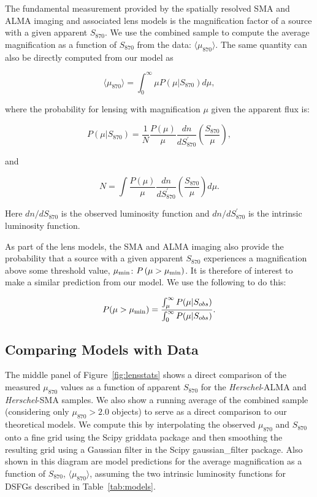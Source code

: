 \documentclass[iop]{emulateapj}
\begin{document}
The fundamental measurement provided by the spatially resolved SMA and ALMA
imaging and associated lens models is the magnification factor of a source with
a given apparent $S_{870}$.  We use the combined sample to compute the average
magnification as a function of $S_{870}$ from the data:
$\langle\mu_{870}\rangle$.  The same quantity can also be directly computed
from our model as 

\begin{equation}
    \langle\mu_{870}\rangle = \int_0^\infty \mu P(\mu|S_{870})  d\mu,
 \end{equation}

\noindent where the probability for lensing with magnification $\mu$ given the
apparent flux is:

\begin{equation}
    P(\mu|S_{870}) = \frac{1}{N} \frac{P(\mu)}{\mu} \frac{dn}{dS_{870}^\prime}
\left(\frac{S_{870}}{\mu}\right),
\end{equation} 

\noindent and 

\begin{equation}
    N = \int \frac{P(\mu)}{\mu} \frac{dn}{dS_{870}^\prime}
    \left(\frac{S_{870}}{\mu}\right)d\mu.
\end{equation}

\noindent Here $ dn/dS_{870}$ is the observed luminosity function and
$dn/dS_{870}^\prime$ is the intrinsic luminosity function.

As part of the lens models, the SMA and ALMA imaging also provide the
probability that a source with a given apparent $S_{870}$ experiences a
magnification above some threshold value, $\mu_{\rm min}$: $P\,(\mu > \mu_{\rm
min})$.  It is therefore of interest to make a similar prediction from our
model.  We use the following to do this:

\begin{equation}
    P(\mu>\mu_{\rm min}) = \frac{\int_\mu^\infty P(\mu|S_{obs})}{\int_0^\infty
    P(\mu|S_{obs})}.
\end{equation}

\subsection{Comparing Models with Data}

The middle panel of Figure~\ref{fig:lensstats} shows a direct comparison of the
measured $\mu_{870}$ values as a function of apparent $S_{870}$ for the {\it
Herschel}-ALMA and {\it Herschel}-SMA samples.  We also show a running average
of the combined sample (considering only $\mu_{870} > 2.0$ objects) to serve as
a direct comparison to our theoretical models.  We compute this by
interpolating the observed $\mu_{870}$ and $S_{870}$ onto a fine grid using the
{\sc Scipy} {\sc griddata} package and then smoothing the resulting grid using
a Gaussian filter in the Scipy {\sc gaussian\_filter} package.
Also shown in this diagram are model predictions for the average magnification
as a function of $S_{870}$, $\langle\mu_{870}\rangle$, assuming the two
intrinsic luminosity functions for DSFGs described in Table~\ref{tab:models}.  
\end{document}
